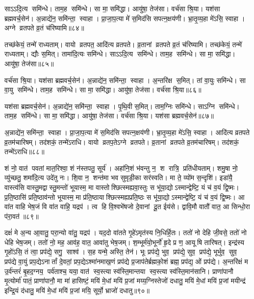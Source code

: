 साऽऽदि॒त्य समि॑न्धे। 
ताम॒ह समि॑न्धे। 
सा मा॒ समि॑द्धा। 
आयु॑षा॒ तेज॑सा। 
वर्च॑सा श्रि॒या। 
यश॑सा ब्रह्मवर्च॒सेन॑। 
अ॒न्नाद्ये॑न॒ समि॑न्ता॒ स्वाहा। 
प्रा॒जा॒प॒त्या मे॑ स॒मिद॑सि सपत्न॒क्षय॑णी। 
भ्रा॒तृ॒व्य॒हा मे॑ऽसि॒ स्वाहा। 
अग्ने व्रतपते व्र॒तं च॑रिष्यामि॥८४॥

तच्छ॑केयं॒ तन्मे॑ राध्यताम्। 
वायो व्रतपत॒ आदि॑त्य व्रतपते। 
व्र॒तानां व्रतपते व्र॒तं च॑रिष्यामि। 
तच्छ॑केयं॒ तन्मे॑ राध्यताम्। 
द्यौः स॒मित्। 
तामा॑दि॒त्यः समि॑न्धे। 
साऽऽदि॒त्य समि॑न्धे। 
ताम॒ह समि॑न्धे। 
सा मा॒ समि॑द्धा। 
आयु॑षा॒ तेज॑सा॥८५॥

वर्च॑सा श्रि॒या। 
यश॑सा ब्रह्मवर्च॒सेन॑। 
अ॒न्नाद्ये॑न॒ समि॑न्ता॒ स्वाहा। 
अ॒न्तरि॑क्ष स॒मित्। 
तां वा॒युः समि॑न्धे। 
सा वा॒यु समि॑न्धे। 
ताम॒ह समि॑न्धे। 
सा मा॒ समि॑द्धा। 
आयु॑षा॒ तेज॑सा। 
वर्च॑सा श्रि॒या॥८६॥

यश॑सा ब्रह्मवर्च॒सेन॑। 
अ॒न्नाद्ये॑न॒ समि॑न्ता॒ स्वाहा। 
पृ॒थि॒वी स॒मित्। 
ताम॒ग्निः समि॑न्धे। 
साऽग्नि समि॑न्धे। 
ताम॒ह समि॑न्धे। 
सा मा॒ समि॑द्धा। 
आयु॑षा॒ तेज॑सा। 
वर्च॑सा श्रि॒या। 
यश॑सा ब्रह्मवर्च॒सेन॑॥८७॥

अ॒न्नाद्ये॑न॒ समि॑न्ता॒ स्वाहा। 
प्रा॒जा॒प॒त्या मे॑ स॒मिद॑सि सपत्न॒क्षय॑णी। 
भ्रा॒तृ॒व्य॒हा मे॑ऽसि॒ स्वाहा। 
आदि॑त्य व्रतपते व्र॒तम॑चारिषम्। 
तद॑शकं॒ तन्मे॑ऽराधि। 
वायो व्रतप॒तेऽग्ने व्रतपते। 
व्र॒तानां व्रतपते व्र॒तम॑चारिषम्। 
तद॑शकं॒ तन्मे॑ऽराधि॥८८॥
\anuvakamend[स॒मित्समि॑न्धे व्र॒तं च॑रिष्या॒म्यायु॑षा॒ तेज॑सा॒ वर्च॑सा श्रि॒या यश॑सा ब्रह्मवर्च॒सेना॒ष्टौ च॑]


शं नो॒ वात॑ पवतां मात॒रिश्वा॒ शं न॑स्तपतु॒ सूर्य॑। 
अहा॑नि॒शं भ॑वन्तु न॒ श रात्रि॒ प्रति॑धीयताम्। 
शमु॒षा नो॒ व्यु॑च्छतु॒ शमा॑दि॒त्य उदे॑तु नः। 
शि॒वा न॒ शन्त॑मा भव सुमृडी॒का सर॑स्वति। 
मा ते॒ व्यो॑म स॒न्दृशि॑। 
इडा॑यै॒ वास्त्व॑सि वास्तु॒मद्वास्तु॒मन्तो॑ भूयास्म॒ मा वास्तोश्छित्स्मह्यवा॒स्तुः स भू॑या॒द्योऽस्मान्द्वेष्टि॒ यं च॑ व॒यं द्वि॒ष्मः। 
प्र॒ति॒ष्ठासि॑ प्रति॒ष्ठाव॑न्तो भूयास्म॒ मा प्र॑ति॒ष्ठायाश्छित्स्मह्यप्रति॒ष्ठः स भू॑या॒द्योऽस्मान्द्वेष्टि॒ यं च॑ व॒यं द्वि॒ष्मः। 
आ वा॑त वाहि भेष॒जं वि वा॑त वाहि॒ यद्रप॑। 
त्व हि वि॒श्वभे॑षजो दे॒वानां दू॒त ईय॑से। 
द्वावि॒मौ वातौ॑ वात॒ आ सिन्धो॒रा प॑रा॒वत॑॥८९॥

दक्षं॑ मे अ॒न्य आ॒वातु॒ परा॒न्यो वा॑तु॒ यद्रप॑। 
यद॒दो वा॑तते गृ॒हे॑ऽमृत॑स्य नि॒धिर्\mbox{}हि॒तः। 
ततो॑ नो देहि जी॒वसे॒ ततो॑ नो धेहि भेष॒जम्। 
ततो॑ नो॒ मह॒ आव॑ह॒ वात॒ आवा॑तु भेष॒जम्। 
श॒म्भूर्म॑यो॒भूर्नो॑ हृ॒दे प्र ण॒ आयूषि तारिषत्। 
इन्द्र॑स्य गृ॒हो॑ऽसि॒ तं त्वा॒ प्रप॑द्ये॒ सगु॒ साश्व॑। 
स॒ह यन्मे॒ अस्ति॒ तेन॑। 
भूः प्रप॑द्ये॒ भुव॒ प्रप॑द्ये॒ सुव॒ प्रप॑द्ये॒ भूर्भुव॒ सुव॒ प्रप॑द्ये वा॒युं प्रप॒द्येऽनार्तां दे॒वतां॒ प्रप॒द्येऽश्मा॑नमाख॒णं प्रप॑द्ये प्र॒जाप॑तेर्ब्रह्मको॒शं ब्रह्म॒ प्रप॑द्य॒ ओं प्रप॑द्ये। 
अ॒न्तरि॑क्षं म उ॒र्व॑न्तरं॑ बृ॒हद॒ग्नय॒ पर्व॑ताश्च॒ यया॒ वात॑ स्व॒स्त्या स्व॑स्ति॒मान्तया स्व॒स्त्या स्व॑स्ति॒मान॑सानि। 
प्राणा॑पानौ मृ॒त्योर्मा॑ पातं॒ प्राणा॑पानौ॒ मा मा॑ हासिष्टं॒ मयि॑ मे॒धां मयि॑ प्र॒जां मय्य॒ग्निस्तेजो॑ दधातु॒ मयि॑ मे॒धां मयि॑ प्र॒जां मयीन्द्र॑ इन्द्रि॒यं द॑धातु॒ मयि॑ मे॒धां मयि॑ प्र॒जां मयि॒ सूर्यो॒ भ्राजो॑ दधातु॥९०॥

